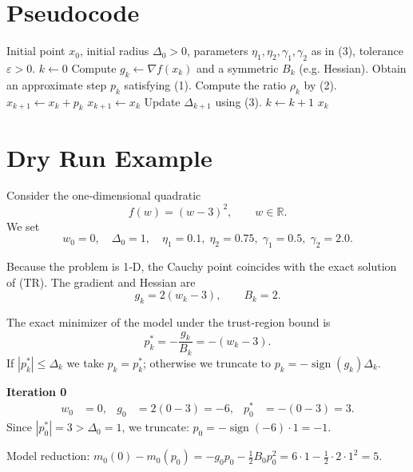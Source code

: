 \documentclass{article}
\newcommand{\norm}[1]{\left\lVert#1\right\rVert}
\newcommand{\R}{\mathbb{R}}
\begin{document}
\section*{Pseudocode}
\begin{algorithm}[H]
\caption{Trust‑Region Method with Approximate Subproblem Solution (TR‑A)}
\begin{algorithmic}[1]
\Require Initial point \(x_{0}\), initial radius \(\Delta_{0}>0\),
          parameters \(\eta_{1},\eta_{2},\gamma_{1},\gamma_{2}\) as in (3),
          tolerance \(\varepsilon>0\).
\State \(k\gets 0\)
\While{\(\norm{\nabla f(x_{k})}> \varepsilon\)}
    \State Compute \(g_{k}\gets\nabla f(x_{k})\) and a symmetric \(B_{k}\) (e.g. Hessian).
    \State Obtain an approximate step \(p_{k}\) satisfying (1).   
    \State Compute the ratio \(\rho_{k}\) by (2).
        \State \(x_{k+1}\gets x_{k}+p_{k}\)          
    \Else
        \State \(x_{k+1}\gets x_{k}\)                
    \EndIf
    \State Update \(\Delta_{k+1}\) using (3).
    \State \(k\gets k+1\)
\EndWhile
\State \Return \(x_{k}\)
\end{algorithmic}
\end{algorithm}

\section*{Dry Run Example}
Consider the one‑dimensional quadratic
\[
f(w)=(w-3)^{2},\qquad w\in\R .
\]
We set
\[
w_{0}=0,\quad \Delta_{0}=1,\quad 
\eta_{1}=0.1,\;\eta_{2}=0.75,\;
\gamma_{1}=0.5,\;\gamma_{2}=2.0 .
\]

Because the problem is 1‑D, the Cauchy point coincides with the exact solution
of (TR).  The gradient and Hessian are
\[
g_{k}=2(w_{k}-3),\qquad B_{k}=2.
\]

The exact minimizer of the model under the trust‑region bound is
\[
p_{k}^{*}= -\frac{g_{k}}{B_{k}}=-(w_{k}-3).
\]
If \(|p_{k}^{*}|\le\Delta_{k}\) we take \(p_{k}=p_{k}^{*}\); otherwise we truncate
to \(p_{k}= -\operatorname{sign}(g_{k})\Delta_{k}\).

\medskip
\textbf{Iteration 0}
\[
\begin{aligned}
w_{0}&=0, &
g_{0}&=2(0-3)=-6, &
p_{0}^{*}&=-(0-3)=3. 
\end{aligned}
\]
Since \(|p_{0}^{*}|=3>\Delta_{0}=1\), we truncate:
\(p_{0}=-\operatorname{sign}(-6)\cdot1= -1\).

Model reduction:
\(m_{0}(0)-m_{0}(p_{0}) = -g_{0}p_{0}-\tfrac12 B_{0}p_{0}^{2}
=6\cdot1-\tfrac12\cdot2\cdot1^{2}=5.\)
\end{document}
